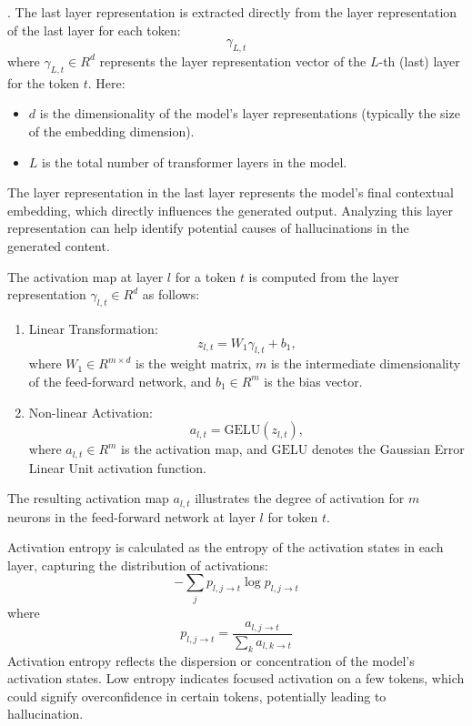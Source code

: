 .
The last layer representation is extracted directly from the layer representation of the last layer for each token:
\[
\gamma_{L, t}
\]
where $\gamma_{L, t} \in R^d$ represents the layer representation vector of the $L$-th (last) layer for the token $t$. Here:
\begin{itemize}
    \item $d$ is the dimensionality of the model's layer representations (typically the size of the embedding dimension).
    \item $L$ is the total number of transformer layers in the model.
\end{itemize}
The layer representation in the last layer represents the model's final contextual embedding, which directly influences the generated output. Analyzing this layer representation can help identify potential causes of hallucinations in the generated content.

The activation map at layer $l$ for a token $t$ is computed from the layer representation $\gamma_{l, t} \in R^d$ as follows:

\begin{enumerate}
    \item Linear Transformation:
    \begin{equation}
    z_{l, t} = W_1 \gamma_{l, t} + b_1,
    \end{equation}
    where $W_1 \in R^{m \times d}$ is the weight matrix, $m$ is the intermediate dimensionality of the feed-forward network, and $b_1 \in R^m$ is the bias vector.

    \item Non-linear Activation:
    \begin{equation}
    a_{l, t} = \text{GELU}(z_{l, t}),
    \end{equation}
    where $a_{l, t} \in R^m$ is the activation map, and $\text{GELU}$ denotes the Gaussian Error Linear Unit activation function.
\end{enumerate}

The resulting activation map $a_{l, t}$ illustrates the degree of activation for $m$ neurons in the feed-forward network at layer $l$ for token $t$.


Activation entropy is calculated as the entropy of the activation states in each layer, capturing the distribution of activations:
\[
-\sum_{j} p_{l,j \rightarrow t} \log p_{l,j \rightarrow t}
\]
where
\[
p_{l,j \rightarrow t} = \frac{a_{l,j \rightarrow t}}{\sum_{k} a_{l,k \rightarrow t}}
\]
Activation entropy reflects the dispersion or concentration of the model's activation states. Low entropy indicates focused activation on a few tokens, which could signify overconfidence in certain tokens, potentially leading to hallucination.

